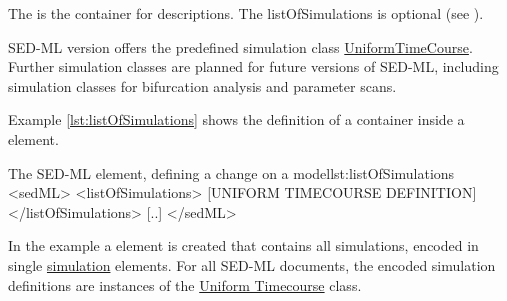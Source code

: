 \label{sec:listOfSimulations}

The  is the container for  descriptions. The listOfSimulations is optional (see ).


%

SED-ML version \version offers the predefined simulation class \hyperref[class:timeCourse]{UniformTimeCourse}. 
Further simulation classes are planned for future versions of SED-ML, including simulation classes for bifurcation analysis and parameter scans. 

Example \ref{lst:listOfSimulations} shows the definition of a  container inside a  element.
\begin{myXmlLst}{The SED-ML  element, defining a change on a model}{lst:listOfSimulations}
<sedML>
 <listOfSimulations>
  [UNIFORM TIMECOURSE DEFINITION]
 </listOfSimulations>
 [..]
</sedML>
\end{myXmlLst}
%
In the example a  element is created that contains all simulations, encoded in single \hyperref[class:simulation]{simulation} elements. For all SED-ML \LoneVone documents, the encoded simulation definitions are instances of the \hyperref[class:timeCourse]{Uniform Timecourse} class.

